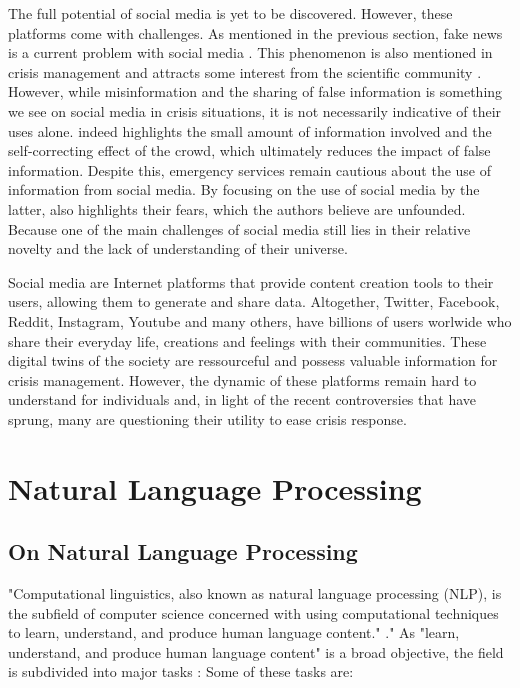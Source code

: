 The full potential of social media is yet to be discovered.
However, these platforms come with challenges.
As mentioned in the previous section, fake news is a current problem with social media \textcite{lazerScienceFakeNews2018,vosoughiSpreadTrueFalse2018,oshikawaSurveyNaturalLanguage2018}.
This phenomenon is also mentioned in crisis management and attracts some interest from the scientific community \textcite{starbirdExaminingAlternativeMedia2017,sellMisinformationUSEbola2020}.
However, while misinformation and the sharing of false information is something we see on social media in crisis situations, it is not necessarily indicative of their uses alone.
\textcite{bubendorffConstructionDisseminationInformation2021} indeed highlights the small amount of information involved and the self-correcting effect of the crowd, which ultimately reduces the impact of false information.
Despite this, emergency services remain cautious about the use of information from social media.
By focusing on the use of social media by the latter, \textcite{tapiaGoodEnoughGood2014} also highlights their fears, which the authors believe are unfounded.
Because one of the main challenges of social media still lies in their relative novelty and the lack of understanding of their universe.

Social media are Internet platforms that provide content creation tools to their users, allowing them to generate and share data.
Altogether, Twitter, Facebook, Reddit, Instagram, Youtube and many others, have billions of users worlwide who share their everyday life, creations and feelings with their communities.
These digital twins of the society are ressourceful and possess valuable information for crisis management.
However, the dynamic of these platforms remain hard to understand for individuals and, in light of the recent controversies that have sprung, many are questioning their utility to ease crisis response.

\section{Natural Language Processing}
\subsection{On Natural Language Processing}
"Computational linguistics, also known as natural language processing (NLP), is the subfield of computer science concerned with using computational techniques to learn, understand, and produce human language content." \textcite{hirschbergAdvancesNaturalLanguage2015}."
As "learn, understand, and produce human language content" is a broad objective, the field is subdivided into major tasks :
Some of these tasks are:

